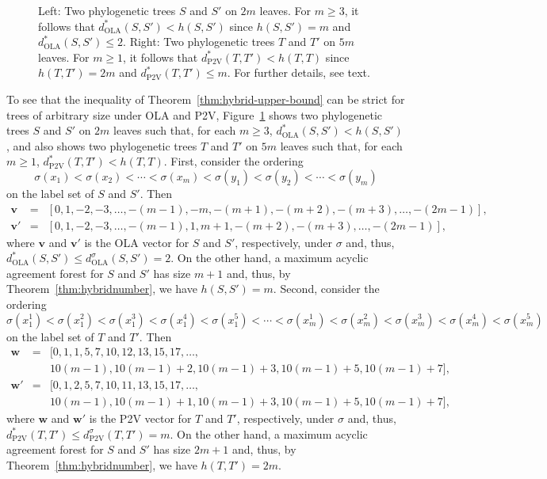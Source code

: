 \documentclass{article}
\newcommand{\OLA}{\mathrm{OLA}}
\newcommand{\PV}{\mathrm{P2V}}
\begin{document}
\begin{figure}[t]
\begin{tikzpicture}[scale=.8]
    \end{tikzpicture}
    \caption{Left: Two phylogenetic trees $S$ and $S'$ on $2m$ leaves. For $m\geq 3$, it follows that $d^*_\OLA(S,S')<h(S,S')$ since  $h(S,S')=m$ and $d^*_\OLA(S,S')\leq 2$. Right: Two phylogenetic trees $T$ and $T'$ on $5m$ leaves. For $m\ge1$, it follows that $d^*_\PV(T,T')<h(T,T)$ since  $h(T,T')=2m$
    and $d^*_\PV(T,T')\leq m$. For further details, see text. 
}
\label{fig:strict-hybrid}
\end{figure}    


To see that the inequality of Theorem~\ref{thm:hybrid-upper-bound} can be strict for trees of arbitrary size under OLA and P2V, Figure~\ref{fig:strict-hybrid} shows two phylogenetic trees $S$ and $S'$ on $2m$ leaves such that, for each $m\geq 3$, $d^*_\OLA(S,S')<h(S,S')$, and also shows two  phylogenetic trees $T$ and $T'$ on $5m$ leaves  such that, for each $m\geq 1$, $d^*_\PV(T,T')<h(T,T)$.  First, consider the ordering $$\sigma(x_1)<\sigma(x_2)<\cdots<\sigma(x_m)<\sigma(y_1)<\sigma(y_2)<\cdots< \sigma(y_m)$$ on the label set of $S$ and $S'$. Then 
\begin{eqnarray*}
\mathbf{v}&=&[0,1,-2,-3,\ldots,-(m-1),-m,-(m+1),-(m+2),-(m+3),\ldots,-(2m-1)],\\
 \mathbf{v}'&=&[0,1,-2,-3,\ldots,-(m-1),1,m+1,-(m+2),-(m+3),\ldots,-(2m-1)],
 \end{eqnarray*}
 where $\mathbf{v}$ and $\mathbf{v}'$ is the OLA vector for $S$ and $S'$, respectively, under $\sigma$ and, thus, $d^*_\OLA(S,S')\leq d_\OLA^\sigma(S,S')=2$. On the other hand, a maximum acyclic agreement forest for $S$ and $S'$ has size $m+1$ and, thus, by Theorem~\ref{thm:hybridnumber}, we have $h(S,S')=m$. Second, consider the ordering $$\sigma(x_1^1)<\sigma(x_1^2)<\sigma(x_1^3)<\sigma(x_1^4)<\sigma(x_1^5)<\cdots<\sigma(x_m^1)<\sigma(x_m^2)<\sigma(x_m^3)<\sigma(x_m^4)<\sigma(x_m^5)$$
 on the label set of $T$ and $T'$.
Then 
\begin{eqnarray*}
\mathbf{w}&=&[0,1,1,5,7,10,12,13,15,17,\ldots,\\
&&10(m-1),10(m-1)+2,10(m-1)+3, 10(m-1)+5,10(m-1)+7],\\
 \mathbf{w}'&=&[0,1,2,5,7,10,11,13,15,17,\ldots,\\
 &&10(m-1),10(m-1)+1,10(m-1)+3,10(m-1)+5,10(m-1)+7],
 \end{eqnarray*}
 where $\mathbf{w}$ and $\mathbf{w}'$ is the P2V vector for $T$ and $T'$, respectively, under $\sigma$ and, thus, $d^*_\PV(T,T')\leq d_\PV^\sigma(T,T')=m$. On the other hand, a maximum acyclic agreement forest for $S$ and $S'$ has size $2m+1$ and, thus, by Theorem~\ref{thm:hybridnumber}, we have $h(T,T')=2m$.
\end{document}
